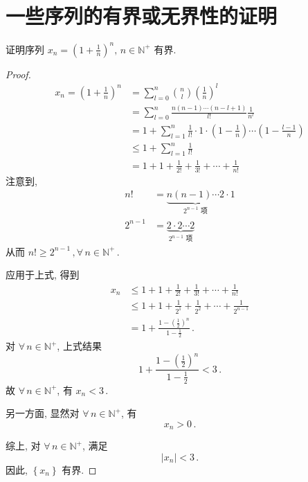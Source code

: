 \documentclass{book}
\newcommand{\Any}{\forall\,}
\newcommand{\set}[1]{\left\{#1\right\}}
\newcommand{\abs}[1]{\left\lvert #1 \right\rvert}
\newcommand{\N}{\mathbb{N}}
\renewcommand{\ge}{\geqslant}
\renewcommand{\le}{\leqslant}
\numberwithin{equation}{section}
\numberwithin{figure}{section}
\theoremstyle{definition}
\begin{document}
\section{一些序列的有界或无界性的证明}
\label{proof:sequencehaveboundary}
证明序列 $x_n=\left( 1+\frac{1}{n} \right)^n,\,n\in\N^+$ 有界.
\begin{proof}
  \begin{align*}
    x_n=\left( 1+\frac{1}{n} \right)^n&=\sum_{l=0}^{n}\binom{n}{l}\left( \frac{1}{n} \right)^l\\
    &=\sum_{l=0}^{n}\frac{n(n-1)\cdots(n-l+1)}{l!}\frac{1}{n^l}\\
    &=1+\sum_{l=1}^{n}\frac{1}{l!}\cdot 1\cdot (1-\frac{1}{n})\cdots(1-\frac{l-1}{n})\\
    &\le 1+\sum_{l=1}^{n}\frac{1}{l!}\\
    &=1+1+\frac{1}{2!}+\frac{1}{3!}+\cdots+\frac{1}{n!}
  \end{align*}
  注意到, 
  \begin{align*}
    n!&=\underbrace{n(n-1)\cdots 2}_{2^{n-1}\text{ 项}}\cdot 1\\
    2^{n-1}&=\underbrace{2\cdot 2\cdots 2}_{2^{n-1}\text{ 项}}
  \end{align*}
  从而 $n!\ge 2^{n-1}\,,\Any n\in\N^+$\,.

  应用于上式, 得到
  \begin{align*}
    x_n&\le 1+1+\frac{1}{2!}+\frac{1}{3!}+\cdots+\frac{1}{n!}\\
    &\le 1+1+\frac{1}{2^1}+\frac{1}{2^2}+\cdots+\frac{1}{2^{n-1}}\\
    &=1+\frac{1-\left( \frac{1}{2} \right)^n}{1-\frac{1}{2}}\,.
  \end{align*}
  对 $\Any n\in\N^+$, 上式结果
  \begin{equation*}
    1+\frac{1-\left( \frac{1}{2} \right)^n}{1-\frac{1}{2}}<3\,.
  \end{equation*}
  故 $\Any n\in\N^+$, 有
  $x_n<3$\,.

  另一方面, 显然对 $\Any n\in\N^+$, 有
  \begin{equation*}
    x_n>0\,.
  \end{equation*}

  综上, 对 $\Any n\in\N^+$, 满足
  \begin{equation*}
    \abs{x_n}<3\,.
  \end{equation*}
  因此, $\set{x_n}$ 有界.
\end{proof}
\end{document}
